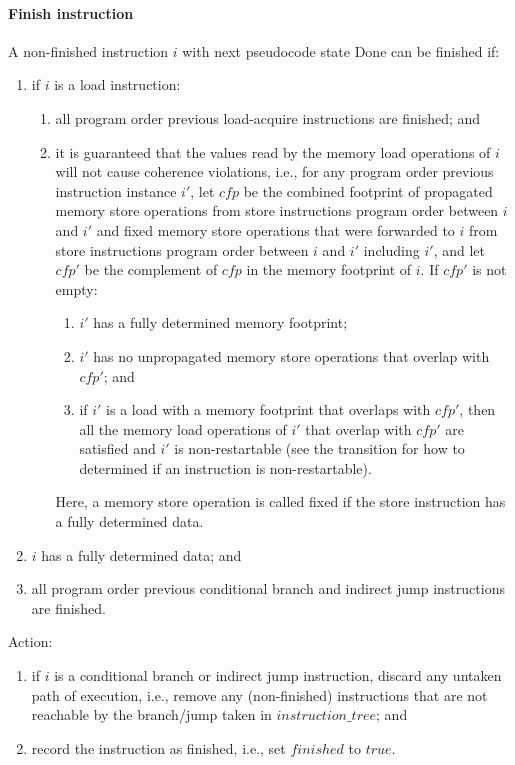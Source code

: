 \paragraph{Finish instruction}\label{omm:finish}
A non-finished instruction $i$ with next pseudocode state {\sc Done} can be finished if:
\begin{enumerate}
\item if $i$ is a load instruction:
  \begin{enumerate}
  \item all program order previous load-acquire instructions are finished; and
  \item it is guaranteed that the values read by the memory load operations of $i$ will not cause coherence violations, i.e., for any program order previous instruction instance $i'$, let $cfp$ be the combined footprint of propagated memory store operations from store instructions program order between $i$ and $i'$ and fixed memory store operations that were forwarded to $i$ from store instructions program order between $i$ and $i'$ including $i'$, and let $cfp'$ be the complement of $cfp$ in the memory footprint of $i$.
  If $cfp'$ is not empty:
    \begin{enumerate}
    \item $i'$ has a fully determined memory footprint;
    \item $i'$ has no unpropagated memory store operations that overlap with $cfp'$; and
    \item if $i'$ is a load with a memory footprint that overlaps with $cfp'$, then all the memory load operations of $i'$ that overlap with $cfp'$ are satisfied and $i'$ is non-restartable (see the  transition for how to determined if an instruction is non-restartable).
    \end{enumerate}
  Here, a memory store operation is called fixed if the store instruction has a fully determined data.
  \end{enumerate}
\item $i$ has a fully determined data; and
\item all program order previous conditional branch and indirect jump instructions are finished.
\end{enumerate}
Action:
\begin{enumerate}
\item if $i$ is a conditional branch or indirect jump instruction, discard any untaken path of execution, i.e., remove any (non-finished) instructions that are not reachable by the branch/jump taken in $instruction\_tree$; and
\item record the instruction as finished, i.e., set $finished$ to $true$.
\end{enumerate}


